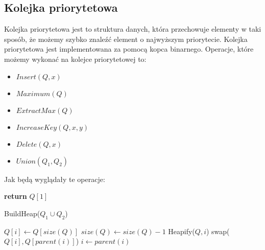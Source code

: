 \documentclass[11pt,a4paper]{article}
\begin{document}
\subsection{Kolejka priorytetowa}
Kolejka priorytetowa jest to struktura danych, która przechowuje elementy w taki sposób, że możemy szybko znaleźć element o najwyższym priorytecie. Kolejka priorytetowa jest implementowana za pomocą kopca binarnego. Operacje, które możemy wykonać na kolejce priorytetowej to:
\begin{itemize}
    \item $Insert(Q,x)$
    \item $Maximum(Q)$
    \item $ExtractMax(Q)$
    \item $IncreaseKey(Q,x,y)$
    \item $Delete(Q,x)$
    \item $Union(Q_1, Q_2)$
\end{itemize}
Jak będą wyglądały te operacje:
\begin{center}
    \begin{algorithm}
        \begin{algorithmic}[1]
                \State \textbf{return} $Q[1]$
            \EndProcedure
        \end{algorithmic}
    \end{algorithm}
\end{center}

\begin{center}
    \begin{algorithm}
        \begin{algorithmic}[1]
            \State BuildHeap($Q_1 \cup Q_2$) 
            \EndProcedure
        \end{algorithmic}
    \end{algorithm}
\end{center}

\begin{center}
    \begin{algorithm}
        \begin{algorithmic}[1]
            \State $Q[i] \gets Q[size(Q)]$ 
            \State $size(Q) \gets size(Q)-1$ 
                \State Heapify($Q, i$) 
            \Else
                    \State swap($Q[i], Q[parent(i)]$) 
                    \State $i \gets parent(i)$
                \EndWhile
            \EndIf
            \EndProcedure
        \end{algorithmic}
    \end{algorithm}
\end{center}
\end{document}
